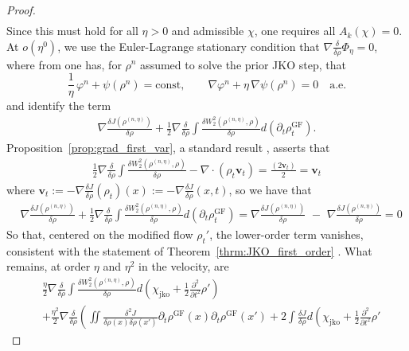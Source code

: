 \documentclass[reqno,11pt,letterpaper]{amsart}
\theoremstyle{plain}
\theoremstyle{definition}
\theoremstyle{remark}
\newcommand{\wass}{\mathrm{GF}}
\newcommand{\wagrad}{\nabla \frac{\delta J}{\delta \rho}}
\newcommand{\jkoreg}{\chi_{\mathrm{jko}}}
\begin{document}
\begin{proof}
\begin{align*}
\end{align*}
Since this must hold for all $\eta > 0$ and admissible $\chi$, one requires all $A_{k}(\chi) = 0$. At $o(\eta^{0})$, we use the Euler-Lagrange stationary condition that $\nabla \frac{\delta}{\delta \rho} \Phi_{\eta} = 0$, where from \cite{Jordan1998} one has, for $\rho^{n}$ assumed to solve the prior JKO step, that
\[
\frac{1}{\eta}\,\varphi^{n}+\psi(\rho^{n})=\text{const},\qquad
\nabla\varphi^{n}+\eta\,\nabla\psi(\rho^{n})=0\quad\text{a.e.}
\]
and identify the term
\begin{align*}
    \nabla \frac{\delta J(\rho^{(n,\eta)})}{\delta \rho} + \frac{1}{2} \nabla \frac{\delta}{\delta \rho} \int \frac{\delta W_{2}^{2} (\rho^{(n,\eta)}, \rho)}{\delta \rho} d(\partial_{t} \rho^{\wass}_{t}).
\end{align*}
Proposition~\ref{prop:grad_first_var}, a standard result \cite{Lott2007,AGS2008,chewi2024statistical}, asserts that
\begin{align*}
    \frac{1}{2} \nabla \frac{\delta}{\delta \rho} \int \frac{\delta W_{2}^{2} (\rho^{(n,\eta)}, \rho)}{\delta \rho} -\nabla \cdot (\rho_{t} \mathbf{v}_{t}) = \frac{\left(2 \mathbf{v}_{t} \right) }{2} = \mathbf{v}_{t}
\end{align*}
where $\mathbf{v}_{t} := - \wagrad (\rho_{t})(x) := - \wagrad (x, t)$, so we have that
\begin{align*}
    &\nabla \frac{\delta J(\rho^{(n,\eta)})}{\delta \rho} + \frac{1}{2} \nabla \frac{\delta}{\delta \rho} \int \frac{\delta W_{2}^{2} (\rho^{(n,\eta)}, \rho)}{\delta \rho} d(\partial_{t} \rho^{\wass}_{t}) = \nabla \frac{\delta J(\rho^{(n,\eta)})}{\delta \rho} \,\, - \,\, \nabla \frac{\delta J(\rho^{(n,\eta)})}{\delta \rho} =0
\end{align*}
So that, centered on the modified flow $\rho_t'$, the lower-order term vanishes, consistent with the statement of Theorem~\ref{thrm:JKO_first_order} \cite{Jordan1998}. What remains, at order $\eta$ and $\eta^{2}$ in the velocity, are
\begin{align*}
    &\frac{\eta}{2} \nabla \frac{\delta}{\delta \rho} \int \frac{\delta W_{2}^{2}(\rho^{(n, \eta)}, \rho)}{ \delta \rho} d\left( \jkoreg + \frac{1}{2} \frac{\partial^{2} }{\partial t^{2}}\rho'
    \right) \\
    &+ \frac{\eta^{2}}{2} \nabla \frac{\delta}{\delta \rho}\left( \iint \frac{\delta^{2} J}{\delta\rho(x) \delta \rho(x')} \partial_{t} \rho^{\wass}(x) \partial_{t} \rho^{\wass}(x') + 2\int \frac{\delta J}{ \delta \rho} d\left( \jkoreg + \frac{1}{2} \frac{\partial^{2} }{\partial t^{2}}\rho'

\end{align*}
\end{proof}
\end{document}
